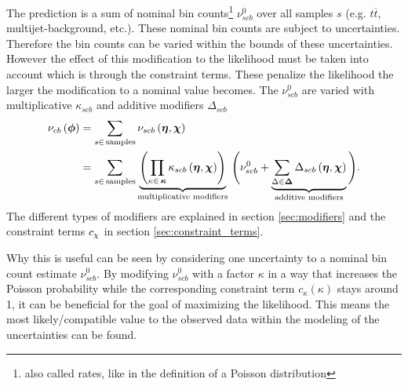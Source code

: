 The prediction is a sum of nominal bin counts\footnote{also called rates, like in the definition of a Poisson distribution} $\nu_{scb}^0$ over all samples $s$ (e.g. $t\overline{t}$, multijet-background, etc.). These nominal bin counts are subject to uncertainties. Therefore the bin counts can be varied within the bounds of these uncertainties. However the effect of this modification to the likelihood must be taken into account which is through the constraint terms. These penalize the likelihood the larger the modification to a nominal value becomes. The $\nu_{scb}^0$ are varied with multiplicative $\kappa_{scb}$ and additive modifiers $\Delta_{scb}$ 
\begin{align}
    \nu_{cb}\left(\bm{\phi}\right) &= \sum_{s\in\mathrm{\,samples}} \nu_{scb}\left(\bm{\eta},\bm{\chi}\right)\\ 
    &= \sum_{s\in\mathrm{\,samples}}\underbrace{\left(\prod_{\kappa\in\,\bm{\kappa}} \kappa_{scb}\left(\bm{\eta},\bm{\chi}\right)\right)}_{\text{multiplicative modifiers}}\, 
    \Bigg(\nu_{scb}^0 + \underbrace{\sum_{\Delta\in\bm{\Delta}} \Delta_{scb}\left(\bm{\eta},\bm{\chi}\right)}_{\text{additive modifiers}}\Bigg).
\end{align}
The different types of modifiers are explained in section \ref{sec:modifiers} and the constraint terms $c_{\chi}$ in section \ref{sec:constraint_terms}.

Why this is useful can be seen by considering one uncertainty to a nominal bin count estimate $\nu_{scb}^0$. By modifying $\nu_{scb}^0$ with a factor $\kappa$ in a way that increases the Poisson probability while the corresponding constraint term $c_\kappa(\kappa)$ stays around 1, it can be beneficial for the goal of maximizing the likelihood. This means the most likely/compatible value to the observed data within the modeling of the uncertainties can be found. 

